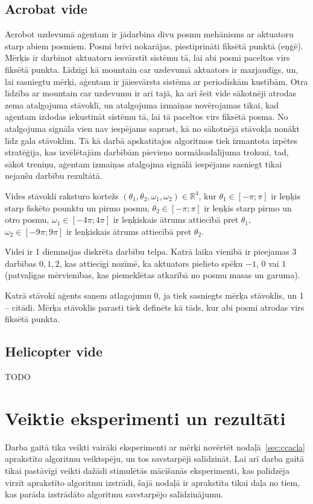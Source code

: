 \documentclass{ludis} %
\begin{document}
\subsection{Acrobat vide}
Acrobot uzdevumā aģentam ir jādarbina divu posmu mehānisms ar aktuatoru starp
abiem posmiem. Posmi brīvi nokarājas, piestiprināti fiksētā punktā (eņģē).
Mērķis ir darbinot aktuatoru iesvārstīt sistēmu tā, lai abi posmi paceltos virs
fiksētā punkta. Līdzīgi kā mountain car uzdevumā aktuators ir mazjaudīgs, un,
lai sasniegtu mērķi, aģentam ir jāiesvārsta sistēma ar periodiskām kustībām.
Otra līdzība ar mountain car uzdevumu ir arī tajā, ka arī šeit vide sākotnēji
atrodas zema atalgojuma stāvoklī, un atalgojuma izmaiņas novērojamas tikai, kad
aģentam izdodas iekustināt sistēmu tā, lai tā paceltos virs fiksētā posma.
No atalgojuma signāla vien nav iespējams saprast, kā no sākotnējā stāvokļa
nonākt līdz gala stāvoklim. Tā kā darbā apskatītajos algoritmos tiek izmantota
izpētes stratēģija, kas izvēlētajām darbībām pievieno normālsadalījuma troksni,
tad, sākot treniņu, aģentam izmaiņas atalgojma signālā iespējams sasniegt tikai
nejaušu darbību rezultātā.

Vides stāvokli raksturo kortežs $(\theta_1, \theta_2, \omega_1, \omega_2) \in
\mathbb{R}^4$, kur $\theta_1 \in [-\pi; \pi]$ ir leņķis starp fiskēto pounktu un
pirmo posmu, $\theta_2 \in [-\pi; \pi]$ ir leņķis starp pirmo un otro posmu,
$\omega_1 \in [-4\pi; 4\pi]$ ir leņķiskais ātrums attiecībā pret $\theta_1$,
$\omega_2 \in [-9\pi; 9\pi]$ ir leņķiskais ātrums attiecībā pret $\theta_2$.

Videi ir 1 diemnsijas diskrēta darbību telpa. Katrā laika vienībā ir pieejamas 3
darbības ${0, 1, 2}$, kas attiecīgi nozīmē, ka aktuators pielieto spēku $-1$,
$0$ vai $1$ (patvaļīgas mērvienības, kas piemeklētas atkarībā no posmu masas un
garuma).

Katrā stāvokī aģents saņem atlagojumu 0, ja tiek sasniegts mērķa stāvoklis, un 1
-- citādi. Mērķa stāvoklis parasti tiek definēts kā tāds, kur abi posmi atrodas
virs fiksētā punkta. %


\subsection{Helicopter vide}
TODO


\section{Veiktie eksperimenti un rezultāti}\label{sec:exp}
Darba gaitā tika veikti vairāki eksperimenti ar mērķi novērtēt
nodaļā~\ref{sec:ccacla} aprakstīto algoritmu veiktspēju, un tos savstarpēji
salīdzināt. Lai arī darba gaitā tikai pastāvīgi veikti dažādi stimulētās
mācīšanās eksperimenti, kas palīdzēja virzīt aprakstīto algoritmu izstrādi, šajā
nodaļā ir aprakstīta tikai daļa no tiem, kas parāda izstrādāto algoritmu
savstarpējo salīdzinājumu.
\end{document}
